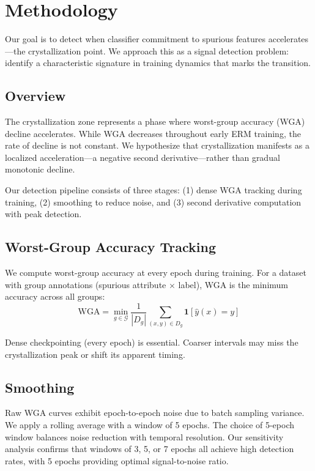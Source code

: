 \section{Methodology}

Our goal is to detect when classifier commitment to spurious features accelerates---the crystallization point. We approach this as a signal detection problem: identify a characteristic signature in training dynamics that marks the transition.

\subsection{Overview}

The crystallization zone represents a phase where worst-group accuracy (WGA) decline accelerates. While WGA decreases throughout early ERM training, the rate of decline is not constant. We hypothesize that crystallization manifests as a localized acceleration---a negative second derivative---rather than gradual monotonic decline.

Our detection pipeline consists of three stages: (1) dense WGA tracking during training, (2) smoothing to reduce noise, and (3) second derivative computation with peak detection.

\subsection{Worst-Group Accuracy Tracking}

We compute worst-group accuracy at every epoch during training. For a dataset with group annotations (spurious attribute $\times$ label), WGA is the minimum accuracy across all groups:
\begin{equation}
\text{WGA} = \min_{g \in \mathcal{G}} \frac{1}{|D_g|} \sum_{(x,y) \in D_g} \mathbf{1}[\hat{y}(x) = y]
\end{equation}

Dense checkpointing (every epoch) is essential. Coarser intervals may miss the crystallization peak or shift its apparent timing.

\subsection{Smoothing}

Raw WGA curves exhibit epoch-to-epoch noise due to batch sampling variance. We apply a rolling average with a window of 5 epochs. The choice of 5-epoch window balances noise reduction with temporal resolution. Our sensitivity analysis confirms that windows of 3, 5, or 7 epochs all achieve high detection rates, with 5 epochs providing optimal signal-to-noise ratio.

